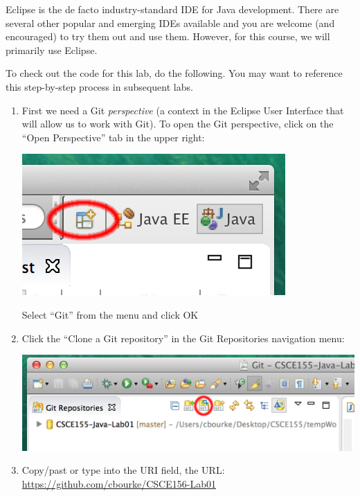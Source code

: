 \documentclass[12pt]{scrartcl}
\begin{document}
Eclipse is the de facto industry-standard IDE for Java development.  There
are several other popular and emerging IDEs available and you are welcome
(and encouraged) to try them out and use them.  However, for this course, we
will primarily use Eclipse.

To check out the code for this lab, do the following.  You may want
to reference this step-by-step process in subsequent labs.

\begin{enumerate}
  \item First we need a Git \emph{perspective} (a context in the Eclipse User Interface that 
  	will allow us to work with Git).  To open the Git perspective, click on the ``Open Perspective''
	tab in the upper right:
	\begin{center}
	\includegraphics[scale=0.50]{images/eclipseOpenPerspectiveMarkUp}
	\end{center}
	Select ``Git'' from the menu and click OK
  \item Click the ``Clone a Git repository'' in the Git Repositories navigation menu:
  	\begin{center}
	\includegraphics[scale=0.50]{images/eclipseGitRepoMarkUp}
	\end{center}
  \item Copy/past or type into the URI field, the URL: \\
  	\url{https://github.com/cbourke/CSCE156-Lab01}
  	\begin{center}

\end{center}
\end{enumerate}
\end{document}
